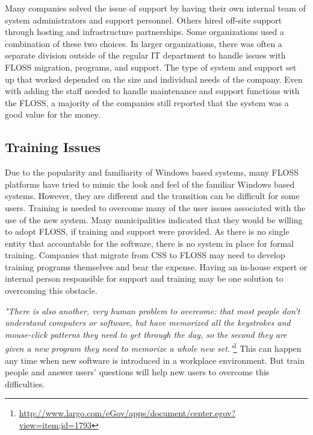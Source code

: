  Many companies solved the issue of support by having their own internal team of system administrators and support personnel. Others hired off-site support through hosting and infrastructure partnerships. Some organizations used a combination of these two choices. In larger organizations, there was often a separate division outside of the regular IT department to handle issues with FLOSS migration, programs, and support. The type of system and support set up that worked depended on the size and individual needs of the company.  Even with adding the staff needed to handle maintenance and support functions with the FLOSS, a majority of the companies still reported that the system was a good value for the money.

 \subsection{Training Issues}

 Due to the popularity and familiarity of Windows based systems, many FLOSS platforms have tried to mimic the look and feel of the familiar Windows based systems. However, they are different and the transition can be difficult for some users. Training is needed to overcome many of the user issues associated with the use of the new system. Many municipalities indicated that they would be willing to adopt FLOSS, if training and support were provided. As there is no single entity that accountable for the software, there is no system in place for formal training. Companies that migrate from CSS to FLOSS may need to develop training programs themselves and bear the expense. Having an in-house expert or internal person responsible for support and training may be one solution to overcoming this obstacle.
 
\textit{"There is also another, very human problem to overcome: that most people don't understand computers or software, but have memorized all the keystrokes and mouse-click patterns they need to get through the day, so the second they are given a new program they need to memorize a whole new set."}\footnote{\url{http://www.largo.com/eGov/apps/document/center.egov?view=item;id=1793}} This can happen any time when new software is introduced in a workplace environment. But train people and answer users' questions will help new users to overcome this difficulties.

